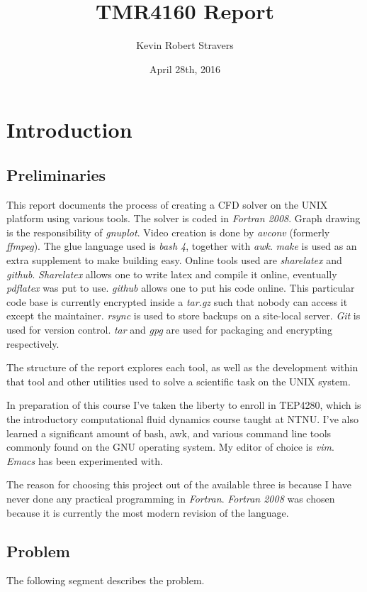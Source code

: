 \documentclass[listof=totoc]{report}
\title{TMR4160 Report}
\author{Kevin Robert Stravers}
\date{April 28th, 2016}
\begin{document}
\maketitle

\tableofcontents
\lstlistoflistings

\chapter{Introduction}
\section{Preliminaries}
This report documents the process of creating a CFD solver on the UNIX platform using various tools. The solver is coded in \emph{Fortran 2008}. Graph drawing is the responsibility of \emph{gnuplot}. Video creation is done by \emph{avconv} (formerly \emph{ffmpeg}). The glue language used is \emph{bash 4}, together with \emph{awk}. \emph{make} is used as an extra supplement to make building easy. Online tools used are \emph{sharelatex} and \emph{github}. \emph{Sharelatex} allows one to write latex and compile it online, eventually \emph{pdflatex} was put to use. \emph{github} allows one to put his code online. This particular code base is currently encrypted inside a \emph{tar.gz} such that nobody can access it except the maintainer. \emph{rsync} is used to store backups on a site-local server. \emph{Git} is used for version control. \emph{tar} and \emph{gpg} are used for packaging and encrypting respectively.

The structure of the report explores each tool, as well as the development within that tool and other utilities used to solve a scientific task on the UNIX system.

In preparation of this course I've taken the liberty to enroll in TEP4280, which is the introductory computational fluid dynamics course taught at NTNU. I've also learned a significant amount of bash, awk, and various command line tools commonly found on the GNU operating system. My editor of choice is \emph{vim}. \emph{Emacs} has been experimented with.

The reason for choosing this project out of the available three is because I have never done any practical programming in \emph{Fortran}. \emph{Fortran 2008} was chosen because it is currently the most modern revision of the language.

\section{Problem}
The following segment describes the problem.
\end{document}
